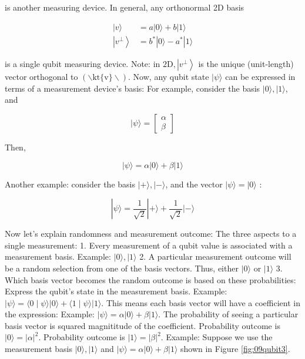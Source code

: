 \documentclass[main.tex]{subfiles}
\begin{document}
    is another measuring device. In general, any orthonormal 2D basis
    
    $$
    \begin{aligned}
    |v\rangle &=a|0\rangle+b|1\rangle \\
    \left|v^{\perp}\right\rangle &=b^{*}|0\rangle-a^{*}|1\rangle
    \end{aligned}
    $$
    
    is a single qubit measuring device. Note: in $2 \mathrm{D},\left|v^{\perp}\right\rangle$ is the unique (unit-length) vector orthogonal to $(\backslash \mathrm{kt}\{\mathrm{v}\} \backslash)$. Now, any qubit state $|\psi\rangle$ can be expressed in terms of a measurement device's basis: For example, consider the basis $|0\rangle,|1\rangle$, and
   
    $$
    |\psi\rangle=\left[\begin{array}{l}
    \alpha \\
    \beta
    \end{array}\right]
    $$
    
    Then,
    
    $$
    |\psi\rangle=\alpha|0\rangle+\beta|1\rangle
    $$
    
    Another example: consider the basis $|+\rangle,|-\rangle$, and the vector $|\psi\rangle=|0\rangle$ :
    
    $$
    |\psi\rangle=\frac{1}{\sqrt{2}}|+\rangle+\frac{1}{\sqrt{2}}|-\rangle
    $$
    
    Now let's explain randomness and measurement outcome: The three aspects to a single measurement: 1. Every measurement of a qubit value is associated with a measurement basis. Example: $|0\rangle,|1\rangle$ 2. A particular measurement outcome will be a random selection from one of the basis vectors. Thus, either $|0\rangle$ or $|1\rangle$ 3. Which basis vector becomes the random outcome is based on these probabilities: Express the qubit's state in the measurement basis. Example: $|\psi\rangle=\langle 0 \mid \psi\rangle|0\rangle+\langle 1 \mid \psi\rangle|1\rangle$. This means each basis vector will have a coefficient in the expression: Example: $|\psi\rangle=\alpha|0\rangle+\beta|1\rangle$. The probability of seeing a particular basis vector is squared magnititude of the coefficient. Probability outcome is $|0\rangle=|\alpha|^{2}$. Probability outcome is $|1\rangle=|\beta|^{2}$. Example: Suppose we use the measurement basis $|0\rangle,|1\rangle$ and $|\psi\rangle=\alpha|0\rangle+\beta|1\rangle$ shown in Figure \ref{fig:09qubit3}.
    
\end{document}
